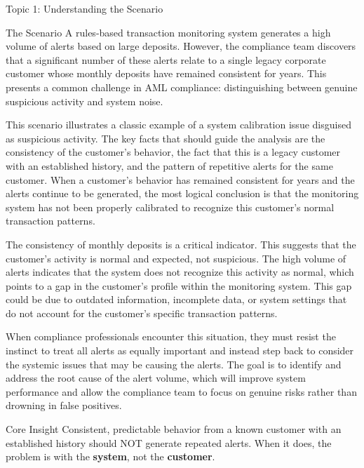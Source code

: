 \documentclass[5pt]{beamer}
\begin{document}
	\begin{frame}{Topic 1: Understanding the Scenario}
		\begin{block}{\tiny The Scenario}
			\tiny A rules-based transaction monitoring system generates a high volume of alerts based on large deposits. However, the compliance team discovers that a significant number of these alerts relate to a single legacy corporate customer whose monthly deposits have remained consistent for years. This presents a common challenge in AML compliance: distinguishing between genuine suspicious activity and system noise.
			
			This scenario illustrates a classic example of a system calibration issue disguised as suspicious activity. The key facts that should guide the analysis are the consistency of the customer's behavior, the fact that this is a legacy customer with an established history, and the pattern of repetitive alerts for the same customer. When a customer's behavior has remained consistent for years and the alerts continue to be generated, the most logical conclusion is that the monitoring system has not been properly calibrated to recognize this customer's normal transaction patterns.
			
			The consistency of monthly deposits is a critical indicator. This suggests that the customer's activity is normal and expected, not suspicious. The high volume of alerts indicates that the system does not recognize this activity as normal, which points to a gap in the customer's profile within the monitoring system. This gap could be due to outdated information, incomplete data, or system settings that do not account for the customer's specific transaction patterns.
			
			When compliance professionals encounter this situation, they must resist the instinct to treat all alerts as equally important and instead step back to consider the systemic issues that may be causing the alerts. The goal is to identify and address the root cause of the alert volume, which will improve system performance and allow the compliance team to focus on genuine risks rather than drowning in false positives.
		\end{block}
		
		\begin{alertblock}{Core Insight}
			\tiny Consistent, predictable behavior from a known customer with an established history should NOT generate repeated alerts. When it does, the problem is with the \textbf{system}, not the \textbf{customer}.
		\end{alertblock}
	\end{frame}
	
\end{document}
